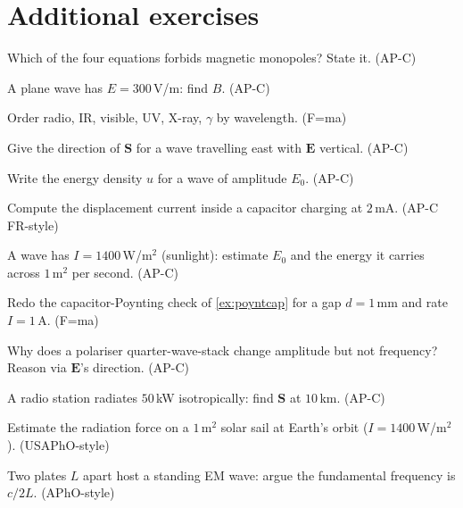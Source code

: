 \section*{Additional exercises}

\begin{exercise}[easy]
Which of the four equations forbids magnetic monopoles? State it. (AP-C)
\end{exercise}
\begin{exercise}[easy]
A plane wave has $E=300$\,V/m: find $B$. (AP-C)
\end{exercise}
\begin{exercise}[easy]
Order radio, IR, visible, UV, X-ray, $\gamma$ by wavelength. (F=ma)
\end{exercise}
\begin{exercise}[easy]
Give the direction of $\mathbf S$ for a wave travelling east with
$\mathbf E$ vertical. (AP-C)
\end{exercise}
\begin{exercise}[easy]
Write the energy density $u$ for a wave of amplitude $E_0$. (AP-C)
\end{exercise}
\begin{exercise}[medium]
Compute the displacement current inside a capacitor charging at
$2$\,mA. (AP-C FR-style)
\end{exercise}
\begin{exercise}[medium]
A wave has $I=1400$\,W/m$^{2}$ (sunlight): estimate $E_0$ and the
energy it carries across $1$\,m$^{2}$ per second. (AP-C)
\end{exercise}
\begin{exercise}[medium]
Redo the capacitor-Poynting check of \ref{ex:poyntcap} for a gap
$d=1$\,mm and rate $I=1$\,A. (F=ma)
\end{exercise}
\begin{exercise}[medium]
Why does a polariser quarter-wave-stack change amplitude but not
frequency? Reason via $\mathbf E$'s direction. (AP-C)
\end{exercise}
\begin{exercise}[medium]
A radio station radiates $50$\,kW isotropically: find $\mathbf S$ at
$10$\,km. (AP-C)
\end{exercise}
\begin{exercise}[hard]
Estimate the radiation force on a $1$\,m$^{2}$ solar sail at Earth's
orbit ($I=1400$\,W/m$^{2}$). (USAPhO-style)
\end{exercise}
\begin{exercise}[hard]
Two plates $L$ apart host a standing EM wave: argue the fundamental
frequency is $c/2L$. (APhO-style)
\end{exercise}
